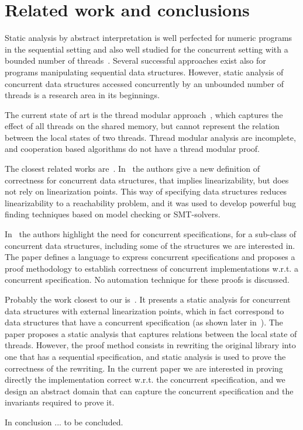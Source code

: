 \section{Related work and conclusions}

Static analysis by abstract interpretation is well perfected for numeric programs in the sequential setting and also well studied for the concurrent setting with a bounded number of threads~\cite{mine15,octogons,poly}. 
Several successful approaches exist also for programs manipulating  sequential data structures\cite{SagivRW02,LiBCR17,pldi11}. 
However, static analysis of concurrent data structures accessed concurrently by an unbounded number of threads is a research area in its beginnings. 

The current state of art is the thread modular approach~\cite{threadmodular, Vafeiadis09, vv1}, which  captures the effect of all threads on the shared memory, but cannot represent the relation between the local states of two threads.  Thread modular analysis are incomplete, and cooperation based algorithms do not have a thread modular proof. 

The closest related works are~\cite{cav13,ee1,ee2,ee3,disc15}. 
In~\cite{ee1,ee2,ee3} the authors give a new definition of correctness for concurrent data structures, that implies linearizability, but does not rely on linearization points.  This way of specifying data structures  reduces linearizability to a reachability problem, and it was used to develop powerful bug finding techniques based on model checking or SMT-solvers. 

In~\cite{disc15} the authors highlight the need for concurrent specifications, for a sub-class of concurrent data structures, including some of the structures we are interested in. The paper defines a language to express concurrent specifications and proposes a proof methodology to establish correctness of concurrent implementations w.r.t. a concurrent specification.  No automation technique for these proofs is discussed.  

Probably the work closest to our is~\cite{cav13}. It presents a static analysis for concurrent data structures with external linearization points, which in fact correspond to data structures that have a concurrent specification (as shown later in~\cite{disc15}).  
The paper proposes a static analysis that captures relations between the local state of threads.  
However, the proof method consists in rewriting the original library into one that has a sequential specification, and static analysis is used to prove the correctness of the rewriting. In the current paper we are interested in proving directly the implementation correct w.r.t. the concurrent specification, and we design an abstract domain that can capture the concurrent specification and the invariants required to prove it. 

In conclusion ... to be concluded. 